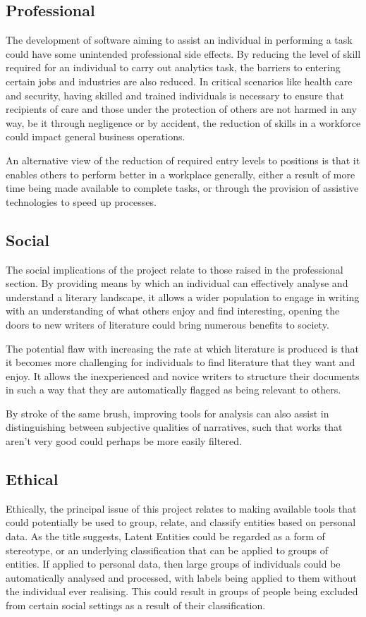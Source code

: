 \documentclass[10pt]{report}
\begin{document}
\subsection{Professional}
The development of software aiming to assist an individual in performing a task could have some unintended professional side effects. By reducing the level of skill required for an individual to carry out analytics task, the barriers to entering certain jobs and industries are also reduced. In critical scenarios like health care and security, having skilled and trained individuals is necessary to ensure that recipients of care and those under the protection of others are not harmed in any way, be it through negligence or by accident, the reduction of skills in a workforce could impact general business operations.

An alternative view of the reduction of required entry levels to positions is that it enables others to perform better in a workplace generally, either a result of more time being made available to complete tasks, or through the provision of assistive technologies to speed up processes.

\subsection{Social}
The social implications of the project relate to those raised in the professional section. By providing means by which an individual can effectively analyse and understand a literary landscape, it allows a wider population to engage in writing with an understanding of what others enjoy and find interesting, opening the doors to new writers of literature could bring numerous benefits to society.

The potential flaw with increasing the rate at which literature is produced is that it becomes more challenging for individuals to find literature that they want and enjoy. It allows the inexperienced and novice writers to structure their documents in such a way that they are automatically flagged as being relevant to others.

By stroke of the same brush, improving tools for analysis can also assist in distinguishing between subjective qualities of narratives, such that works that aren't very good could perhaps be more easily filtered.

\subsection{Ethical}
Ethically, the principal issue of this project relates to making available tools that could potentially be used to group, relate, and classify entities based on personal data. As the title suggests, Latent Entities could be regarded as a form of stereotype, or an underlying classification that can be applied to groups of entities. If applied to personal data, then large groups of individuals could be automatically analysed and processed, with labels being applied to them without the individual ever realising. This could result in groups of people being excluded from certain social settings as a result of their classification.
\end{document}
